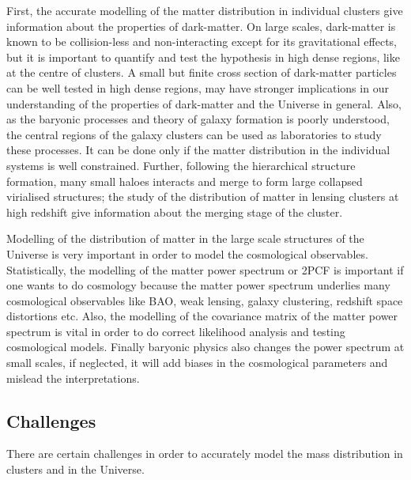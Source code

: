 First, the accurate modelling of the matter distribution in individual clusters
give information about the properties of dark-matter. On large scales, dark-matter
is known to be collision-less and non-interacting except for its gravitational effects,
but it is important to quantify and test the hypothesis in high dense regions, like
at the centre of clusters. A small but finite cross section of dark-matter particles
can be well tested in high dense regions, may have stronger implications in our 
understanding of the properties of dark-matter and the Universe in general.  
Also, as the baryonic processes and theory of galaxy
formation is poorly understood, the central regions of the galaxy clusters can be 
used as laboratories to study these processes. It can be done only if the matter 
distribution in the individual systems is well constrained. 
Further, following the hierarchical structure formation, many small haloes interacts and
merge to form large collapsed virialised structures; the study of the distribution of 
matter in lensing clusters at high redshift give information about the merging
stage of the cluster. 

Modelling of the distribution of matter in the large scale structures of the  
Universe is very important
in order to model the cosmological observables. Statistically, the modelling of the
matter power spectrum or 2PCF is important if one wants to do cosmology because 
the matter power spectrum underlies many
cosmological observables like BAO, weak lensing, galaxy clustering, redshift
space distortions etc. Also, the modelling of the 
covariance matrix of the matter power spectrum is vital in order to do correct
likelihood analysis and testing cosmological models. Finally baryonic physics 
also changes the power spectrum at small scales, if neglected, it will add biases
in the cosmological parameters and mislead the interpretations. 

\subsection{Challenges}

There are certain challenges in order to accurately model the mass distribution
in clusters and in the Universe. 

